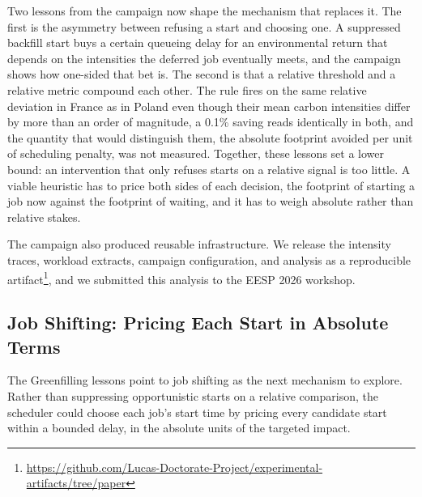 Two lessons from the campaign now shape the mechanism that replaces it. The first is the asymmetry between refusing a start and choosing one. A suppressed backfill start buys a certain queueing delay for an environmental return that depends on the intensities the deferred job eventually meets, and the campaign shows how one-sided that bet is. The second is that a relative threshold and a relative metric compound each other. The rule fires on the same relative deviation in France as in Poland even though their mean carbon intensities differ by more than an order of magnitude, a 0.1\% saving reads identically in both, and the quantity that would distinguish them, the absolute footprint avoided per unit of scheduling penalty, was not measured. Together, these lessons set a lower bound: an intervention that only refuses starts on a relative signal is too little. A viable heuristic has to price both sides of each decision, the footprint of starting a job now against the footprint of waiting, and it has to weigh absolute rather than relative stakes.

The campaign also produced reusable infrastructure. We release the intensity traces, workload extracts, campaign configuration, and analysis as a reproducible artifact\footnote{\url{https://github.com/Lucas-Doctorate-Project/experimental-artifacts/tree/paper}}, and we submitted this analysis to the EESP 2026 workshop.

\subsection{Job Shifting: Pricing Each Start in Absolute Terms}

The Greenfilling lessons point to job shifting as the next mechanism to explore. Rather than suppressing opportunistic starts on a relative comparison, the scheduler could choose each job's start time by pricing every candidate start within a bounded delay, in the absolute units of the targeted impact.

